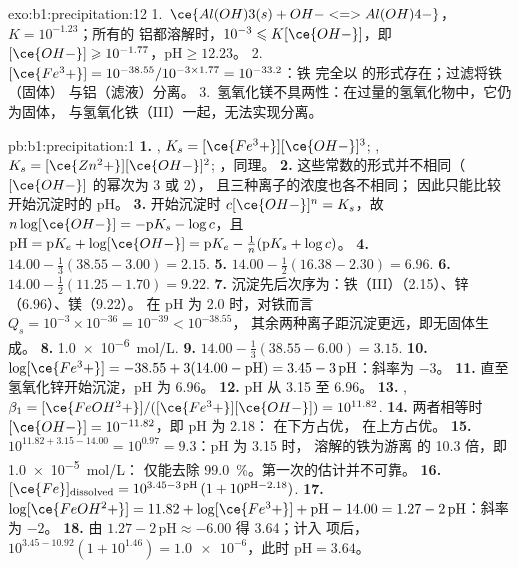 \begin{solution}{exo:b1:precipitation:12}
1.~$\ce{Al(OH)3(s) + OH- <=> Al(OH)4-}$，$K = 10^{-1.23}$；所有的
铝都溶解时，$10^{-3} \leqslant K[\ce{OH-}]$，即
$[\ce{OH-}] \geqslant 10^{-1.77}$，$\mathrm{pH} \geqslant 12.23$。
2.~$[\ce{Fe^3+}] = 10^{-38.55}/10^{-3 \times 1.77} = 10^{-33.2}$：铁
完全以  的形式存在；过滤将铁（固体）
与铝（滤液）分离。
3.~氢氧化镁不具两性：在过量的氢氧化物中，它仍为固体，
与氢氧化铁（III）一起，无法实现分离。
\end{solution}

\begin{solution}{pb:b1:precipitation:1}
\textbf{1.} , $K_s = [\ce{Fe^3+}][\ce{OH-}]^3$;
, $K_s = [\ce{Zn^2+}][\ce{OH-}]^2$;
，同理。
\textbf{2.} 这些常数的形式并不相同（$[\ce{OH-}]$ 的幂次为 3 或 2），
且三种离子的浓度也各不相同；
因此只能比较开始沉淀时的 pH。
\textbf{3.} 开始沉淀时 $c[\ce{OH-}]^n = K_s$，故 $n\log[\ce{OH-}] =
-\mathrm{p}K_s - \log c$，且 $\mathrm{pH} = \mathrm{p}K_e +
\log[\ce{OH-}] = \mathrm{p}K_e - \frac1n(\mathrm{p}K_s + \log c)$。
\textbf{4.} $14.00 - \frac13(38.55 - 3.00) = 2.15$.
\textbf{5.} $14.00 - \frac12(16.38 - 2.30) = 6.96$.
\textbf{6.} $14.00 - \frac12(11.25 - 1.70) = 9.22$.
\textbf{7.} 沉淀先后次序为：铁（III）（2.15）、锌（6.96）、镁（9.22）。
在 pH 为 2.0 时，对铁而言 $Q_s = 10^{-3} \times 10^{-36} = 10^{-39} < 10^{-38.55}$，
其余两种离子距沉淀更远，即无固体生成。
\textbf{8.} \qty{1.0e-6}{mol/L}.
\textbf{9.} $14.00 - \frac13(38.55 - 6.00) = 3.15$.
\textbf{10.} $\log[\ce{Fe^3+}] = -38.55 + 3(14.00 - \mathrm{pH}) = 3.45 -
3\,\mathrm{pH}$：斜率为 $-3$。
\textbf{11.} 直至氢氧化锌开始沉淀，pH 为 6.96。
\textbf{12.} pH 从 3.15 至 6.96。
\textbf{13.} , $\beta_1 =
[\ce{FeOH^2+}]/([\ce{Fe^3+}][\ce{OH-}]) = 10^{11.82}$.
\textbf{14.} 两者相等时 $[\ce{OH-}] = 10^{-11.82}$，即 pH 为 2.18：
 在下方占优， 在上方占优。
\textbf{15.} $10^{11.82 + 3.15 - 14.00} = 10^{0.97} = 9.3$：pH 为 3.15 时，
溶解的铁为游离  的 10.3 倍，即 \qty{1.0e-5}{mol/L}：
仅能去除 \qty{99.0}{\percent}。第一次的估计并不可靠。
\textbf{16.} $[\ce{Fe}]_{\mathrm{dissolved}} = 10^{3.45 - 3\,\mathrm{pH}}\,
(1 + 10^{\mathrm{pH} - 2.18})$.
\textbf{17.} $\log[\ce{FeOH^2+}] = 11.82 + \log[\ce{Fe^3+}] + \mathrm{pH} -
14.00 = 1.27 - 2\,\mathrm{pH}$：斜率为 $-2$。
\textbf{18.} 由 $1.27 - 2\,\mathrm{pH} \approx -6.00$ 得 3.64；计入
 项后，$10^{3.45 - 10.92}(1 + 10^{1.46}) =
\num{1.0e-6}$，此时 $\mathrm{pH} = 3.64$。

\end{solution}
